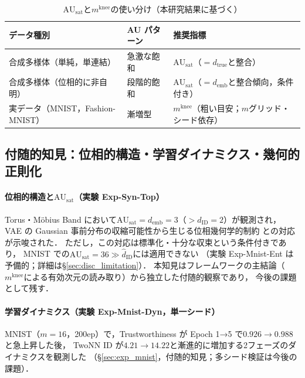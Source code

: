 \documentclass[11pt,a4paper]{jsarticle}
\newcommand{\dID}{d_{\mathrm{ID}}}
\newcommand{\dtrue}{d_{\mathrm{true}}}
\newcommand{\AUsat}{\mathrm{AU}_{\mathrm{sat}}}
\newcommand{\mknee}{m^{\mathrm{knee}}}
\newcommand{\demb}{d_{\mathrm{emb}}}
\begin{document}
\begin{table}[H]
\centering
\caption{$\AUsat$と$\mknee$の使い分け（本研究結果に基づく）}
\label{tab:au_comparison}
\small
\begin{tabular}{lll}
\toprule
データ種別 & AU パターン & 推奨指標 \\
\midrule
合成多様体（単純，単連結） & 急激な飽和 & $\AUsat$（$= \dtrue$と整合） \\
合成多様体（位相的に非自明） & 段階的飽和 & $\AUsat$（$= \demb$と整合傾向，条件付き） \\
実データ（MNIST，Fashion-MNIST） & 漸増型 & $\mknee$（粗い目安；$m$グリッド・シード依存） \\
\bottomrule
\end{tabular}
\end{table}

\subsection{付随的知見：位相的構造・学習ダイナミクス・幾何的正則化}\label{sec:disc_incidental}

\paragraph{位相的構造と$\AUsat$（実験 Exp-Syn-Top）}
Torus・Möbius Band において$\AUsat = \demb = 3$（$> \dID = 2$）が観測され，
VAE の Gaussian 事前分布の収縮可能性から生じる位相幾何学的制約
\cite{hatcher2002algebraic,guillemin1974differential}との対応が示唆された．
ただし，この対応は標準化・十分な収束という条件付きであり，
MNIST での$\AUsat = 36 \gg \hat{d}_\mathrm{ID}$には適用できない
（実験 Exp-Mnist-Ent は予備的；詳細は§\ref{sec:disc_limitation}）．
本知見はフレームワークの主結論（$\mknee$による有効次元の読み取り）から独立した付随的観察であり，
今後の課題として残す．

\paragraph{学習ダイナミクス（実験 Exp-Mnist-Dyn，単一シード）}
MNIST（$m=16$，200ep）で，Trustworthiness が Epoch 1→5 で$0.926 \to 0.988$と急上昇した後，
TwoNN ID が$4.21 \to 14.22$と漸進的に増加する2フェーズのダイナミクスを観測した
（§\ref{sec:exp_mnist}，付随的知見；多シード検証は今後の課題）．
\end{document}
